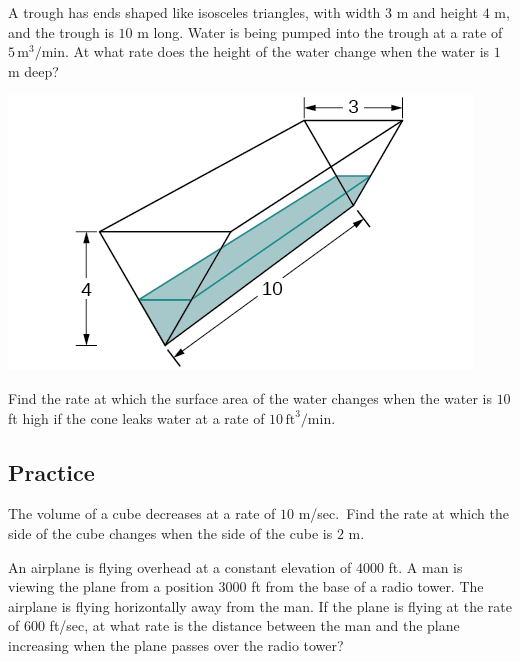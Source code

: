 \begin{example}

A trough has ends shaped like isosceles triangles, with width \(3\) m
and height \(4\) m, and the trough is \(10\) m long. Water is being
pumped into the trough at a rate of \(5\,\text{m}^3\text{/min}\). At
what rate does the height of the water change when the water is \(1\) m
deep?

\includegraphics[scale=0.8]{img/CNX_Calc_Figure_04_01_204.jpeg}

\end{example}
\vspace*{6\baselineskip}

\begin{example}

Find the rate at which the surface area of the water changes when the
water is \(10\) ft high if the cone leaks water at a rate of
\(10 \,\text{ft}^3\text{/min}\).

\end{example}
\vspace*{6\baselineskip}

\subsection{Practice}

\begin{exercise}

The volume of a cube decreases at a rate of \(10\) m/sec.~Find the rate
at which the side of the cube changes when the side of the cube is \(2\)
m.

\end{exercise}
\vspace*{6\baselineskip}

\begin{exercise}

An airplane is flying overhead at a constant elevation of \(4000\) ft. A
man is viewing the plane from a position \(3000\) ft from the base of a
radio tower. The airplane is flying horizontally away from the man. If
the plane is flying at the rate of \(600\) ft/sec, at what rate is the
distance between the man and the plane increasing when the plane passes
over the radio tower?

\end{exercise}
\vspace*{6\baselineskip}

